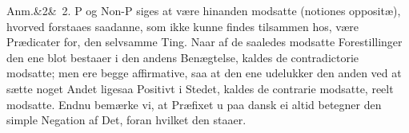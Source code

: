 \documentclass[12pt]{book}
\def\sperr#1{#1}%
\def\textit#1{#1}%
\newcommand{\sperr}[1]{\textls[180]{#1}}
\newcommand{\anm}[1]{%
  \par\vspace{0.5\baselineskip}%
  \noindent\hspace{\parindent}\sperr{Anm.}\ifx&#1&\else~\textit{#1}.\fi
  \enspace\ignorespaces
}
\newcommand{\opage}[1]{\marginnote{\footnotesize\textit{[#1]}}}
\begin{document}
\anm{2} \textit{P} og \textit{Non-P} siges at være hinanden modsatte (\textit{notiones
oppositæ}), hvorved forstaaes saadanne, som ikke kunne findes tilsammen hos, være
Prædicater for, den selvsamme Ting. Naar af de saaledes modsatte Forestillinger den ene
blot bestaaer i den andens Benægtelse, kaldes de \textit{contradictorie} modsatte; men ere
begge \textit{affirmative}, saa at den ene udelukker den anden ved at sætte noget Andet
ligesaa Positivt i Stedet, kaldes de \textit{contrarie} modsatte, reelt modsatte. Endnu
bemærke vi, at Præfixet u
\opage{274} paa dansk ei altid betegner den simple Negation af Det, foran hvilket den staaer.
\end{document}
